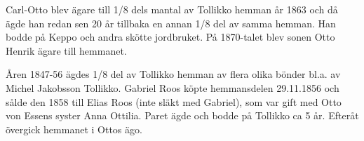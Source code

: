 %
Carl-Otto blev ägare till 1/8 dels mantal av Tollikko hemman år 1863 och då ägde han redan sen 20 år tillbaka en annan 1/8 del av samma hemman. Han bodde på Keppo och andra skötte jordbruket. På 1870-talet blev sonen Otto Henrik ägare till hemmanet.


%
Åren 1847-56 ägdes 1/8 del av Tollikko hemman av flera olika bönder bl.a. av Michel Jakobsson Tollikko. Gabriel Roos köpte hemmansdelen 29.11.1856 och sålde den 1858 till Elias Roos (inte släkt med Gabriel), som var gift med Otto von Essens syster Anna Ottilia. Paret ägde och bodde på Tollikko ca 5 år. Efteråt övergick hemmanet i Ottos ägo.


